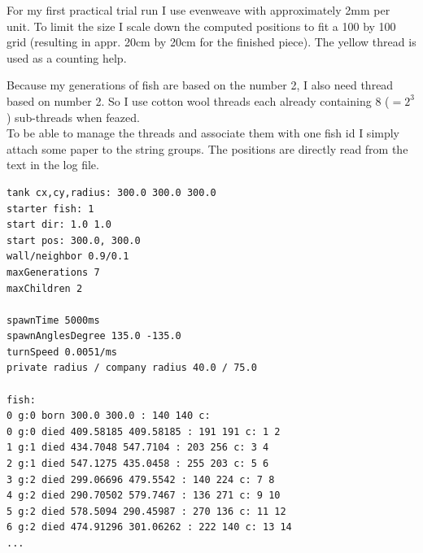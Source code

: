 \documentclass{scrartcl}
\begin{document}
\begin{minipage}[t]{0.48\textwidth}
\end{minipage}
\hspace{0.5cm}
\begin{minipage}[t]{0.48\textwidth}
    For my first practical trial run I use evenweave with approximately 2mm per unit. To limit the size I scale down the computed positions to fit a 100 by 100 grid (resulting in appr. 20cm by 20cm for the finished piece). The yellow thread is used as a counting help.
\end{minipage}
\vspace{0.5cm}
\begin{minipage}[t]{0.48\textwidth}
\end{minipage}
\hspace{0.5cm}
\begin{minipage}[t]{0.48\textwidth}
	Because my generations of fish are based on the number 2, I also need thread based on number 2. So I use cotton wool threads each already containing 8 ($=2^3$) sub-threads when feazed.\\
	To be able to manage the threads and associate them with one fish id I simply attach some paper to the string groups. The positions are directly read from the text in the log file.
\end{minipage}
\vspace{0.5cm}

\begin{minipage}[t]{\textwidth}
\scriptsize
\begin{verbatim}
tank cx,cy,radius: 300.0 300.0 300.0
starter fish: 1
start dir: 1.0 1.0
start pos: 300.0, 300.0
wall/neighbor 0.9/0.1
maxGenerations 7
maxChildren 2

spawnTime 5000ms
spawnAnglesDegree 135.0 -135.0
turnSpeed 0.0051/ms
private radius / company radius 40.0 / 75.0

fish:
0 g:0 born 300.0 300.0 : 140 140 c: 
0 g:0 died 409.58185 409.58185 : 191 191 c: 1 2 
1 g:1 died 434.7048 547.7104 : 203 256 c: 3 4 
2 g:1 died 547.1275 435.0458 : 255 203 c: 5 6 
3 g:2 died 299.06696 479.5542 : 140 224 c: 7 8 
4 g:2 died 290.70502 579.7467 : 136 271 c: 9 10 
5 g:2 died 578.5094 290.45987 : 270 136 c: 11 12 
6 g:2 died 474.91296 301.06262 : 222 140 c: 13 14
...
\end{verbatim}
\end{minipage}
\vspace{0.5cm}
\end{document}
